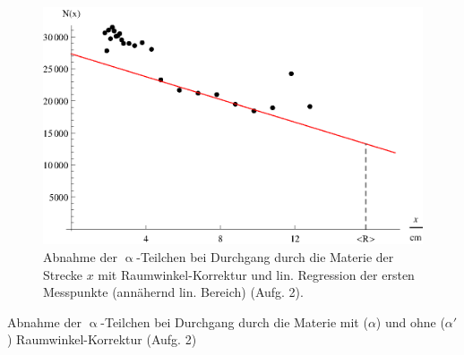 \begin{figure}[tb]
	\centering
	\includegraphics[scale=1.0]{fig/iii_2_plotb.eps}
	\caption{Abnahme der $\upalpha$-Teilchen bei Durchgang durch die Materie der Strecke $x$ mit Raumwinkel-Korrektur und lin. Regression der ersten Messpunkte (annähernd lin. Bereich) (Aufg. 2).}
	\label{fig:iii_2_plotb}
\end{figure}

\begin{table}[tb]
	\centering
	\caption{Abnahme der $\upalpha$-Teilchen bei Durchgang durch die Materie mit ($\alpha$) und ohne ($\alpha'$) Raumwinkel-Korrektur (Aufg. 2)}
	\label{tab:iii_2}
	
\end{table}

\FloatBarrier

